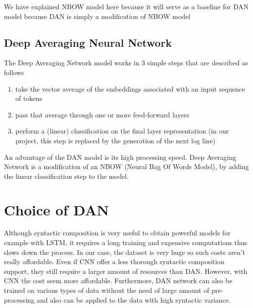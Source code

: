 We have explained NBOW model here because it will serve as a baseline for DAN model because DAN is simply a modification of NBOW model

\subsection{Deep Averaging Neural Network \label{sec:dan}}
The Deep Averaging Network \cite{dan_1, dan_2} model works in 3 simple steps that are described as follows 
\begin{enumerate}
	\item take the vector average of the embeddings associated with an input sequence of tokens
	\item pass that average through one or more feed-forward layers
	\item perform a (linear) classification on the final layer representation (in our project, this step is replaced by the generation of the next log line)
\end{enumerate}

An advantage of the DAN model is its high processing speed.
Deep Averaging Network is a modification of an NBOW (Neural Bag Of Words Model), by adding the linear classification step to the model.

\section*{Choice of DAN}

Although syntactic composition is very useful to obtain powerful models for example with LSTM, it requires a long training and expensive computations thus slows down the process. In our case, the dataset is very huge so such costs aren't really affordable.
Even if CNN offer a less thorough syntactic composition support, they still require a larger amount of resources than DAN. However, with CNN the cost seem more affordable.
Furthermore, DAN network can also be trained on various types of data without the need of large amount of pre-processing and also can be applied to the data with high syntactic variance.

